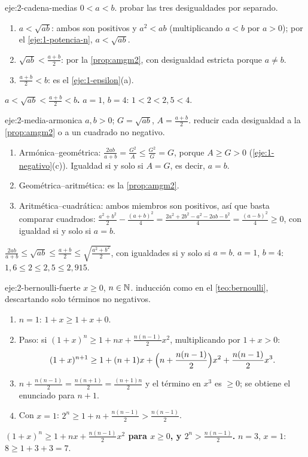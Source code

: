 \begin{solucion}{eje:2-cadena-medias}
\datos $0<a<b$.
\planteamiento probar las tres desigualdades por separado.
\pasos
\begin{enumerate}[label=\arabic*.]
  \item $a<\sqrt{ab}$: ambos son positivos y $a^2<ab$ (multiplicando $a<b$ por $a>0$); por el \cref{eje:1-potencia-n}, $a<\sqrt{ab}$.
  \item $\sqrt{ab}<\frac{a+b}2$: por la \cref{prop:amgm2}, con desigualdad estricta porque $a\neq b$.
  \item $\frac{a+b}2<b$: es el \cref{eje:1-epsilon}(a).
\end{enumerate}
\resultado \textbf{$a<\sqrt{ab}<\frac{a+b}2<b$.}
\comprobacion $a=1$, $b=4$: $1<2<2{,}5<4$.
\end{solucion}

\begin{solucion}{eje:2-media-armonica}
\datos $a,b>0$; $G=\sqrt{ab}$, $A=\frac{a+b}2$.
\planteamiento reducir cada desigualdad a la \cref{prop:amgm2} o a un cuadrado no negativo.
\pasos
\begin{enumerate}[label=\arabic*.]
  \item Armónica--geométrica: $\frac{2ab}{a+b}=\frac{G^2}{A}\le\frac{G^2}{G}=G$, porque $A\ge G>0$ (\cref{eje:1-negativo}(c)). Igualdad si y solo si $A=G$, es decir, $a=b$.
  \item Geométrica--aritmética: es la \cref{prop:amgm2}.
  \item Aritmética--cuadrática: ambos miembros son positivos, así que basta comparar cuadrados: $\frac{a^2+b^2}2-\frac{(a+b)^2}4=\frac{2a^2+2b^2-a^2-2ab-b^2}4=\frac{(a-b)^2}4\ge0$, con igualdad si y solo si $a=b$.
\end{enumerate}
\resultado \textbf{$\frac{2ab}{a+b}\le\sqrt{ab}\le\frac{a+b}2\le\sqrt{\frac{a^2+b^2}2}$}, con igualdades si y solo si $a=b$.
\comprobacion $a=1$, $b=4$: $1{,}6\le2\le2{,}5\le2{,}915$.
\end{solucion}

\begin{solucion}{eje:2-bernoulli-fuerte}
\datos $x\ge0$, $n\in\mathbb{N}$.
\planteamiento inducción como en el \cref{teo:bernoulli}, descartando solo términos no negativos.
\pasos
\begin{enumerate}[label=\arabic*.]
  \item $n=1$: $1+x\ge1+x+0$.
  \item Paso: si $(1+x)^n\ge1+nx+\frac{n(n-1)}2x^2$, multiplicando por $1+x>0$:
  \[
  (1+x)^{n+1}\ge1+(n+1)x+\Bigl(n+\frac{n(n-1)}2\Bigr)x^2+\frac{n(n-1)}2x^3.
  \]
  \item $n+\frac{n(n-1)}2=\frac{n(n+1)}2=\frac{(n+1)n}2$ y el término en $x^3$ es $\ge0$; se obtiene el enunciado para $n+1$.
  \item Con $x=1$: $2^n\ge1+n+\frac{n(n-1)}2>\frac{n(n-1)}2$.
\end{enumerate}
\resultado \textbf{$(1+x)^n\ge1+nx+\frac{n(n-1)}2x^2$ para $x\ge0$, y $2^n>\frac{n(n-1)}2$.}
\comprobacion $n=3$, $x=1$: $8\ge1+3+3=7$.
\end{solucion}

